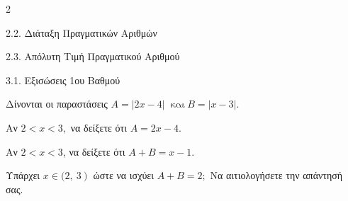\begin{ylh}{2}
    \item 2.2. Διάταξη Πραγματικών Αριθμών
    \item 2.3. Απόλυτη Τιμή Πραγματικού Αριθμού
    \item 3.1. Εξισώσεις 1ου Βαθμού
\end{ylh}
Δίνονται οι παραστάσεις $A = |2x - 4|\ \text{ και}\ B = |x - 3|$.

\begin{alist}
\item Αν $2 < x < 3,$ να δείξετε ότι $A = 2x - 4$.
\item Αν $2 < x < 3$, να δείξετε ότι $A + B = x - 1$.
\item Υπάρχει $x \in (2,\left. \ 3 \right)$ ώστε να ισχύει $A + B = 2;$ Να αιτιολογήσετε την απάντησή σας.
\end{alist}

